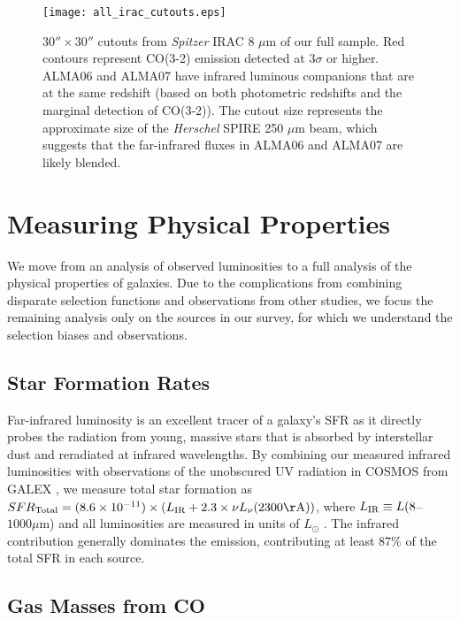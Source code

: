 \documentclass[a4paper,fleqn,usenatbib]{mnras}
\newcommand{\lir}{L_{\rm{IR}}}
\begin{document}
\begin{figure*}
\centering
\texttt{[image: all\_irac\_cutouts.eps]}
\caption{$30'' \times 30''$ cutouts from {\em Spitzer} IRAC 8 $\mu$m of our full sample. Red contours represent CO(3-2) emission detected at 3$\sigma$ or higher. ALMA06 and ALMA07 have infrared luminous companions that are at the same redshift (based on both photometric redshifts and the marginal detection of CO(3-2)). The cutout size represents the approximate size of the {\em Herschel} SPIRE 250 $\mu$m beam, which suggests that the far-infrared fluxes in ALMA06 and ALMA07 are likely blended.}
\label{fig:irac_cutouts}
\end{figure*}



\section{Measuring Physical Properties}\label{sec:phys}

We move from an analysis of observed luminosities to a full analysis of the physical properties of galaxies. Due to the complications from combining disparate selection functions and observations from other studies, we focus the remaining analysis only on the sources in our survey, for which we understand the selection biases and observations. 

\subsection{Star Formation Rates}

Far-infrared luminosity is an excellent tracer of a galaxy's SFR as it directly probes the radiation from young, massive stars that is absorbed by interstellar dust and reradiated at infrared wavelengths. By combining our measured infrared luminosities with observations of the unobscured UV radiation in COSMOS from GALEX \citep{2007ApJS..172...99C}, we measure total star formation as $SFR_{\rm{Total}} = (8.6 \times 10^{-11}) \times (\lir + 2.3 \times \nu L_{\nu}(2300 \rm{\AA}))$, where $L_{\rm{IR}} \equiv L(8$--$1000 \mu$m) and all luminosities are measured in units of $L_{\odot}$ \citep{2013A&A...558A..67A}.  The infrared contribution generally dominates the emission, contributing at least 87\% of the total SFR in each source. 

\subsection{Gas Masses from CO}\label{sec:gas_mass}
\end{document}
